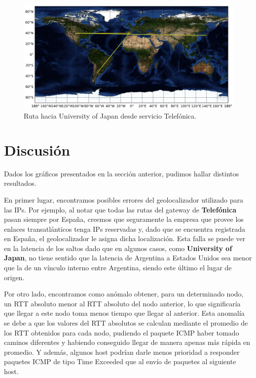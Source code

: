 \documentclass[10pt, a4paper]{article}
\begin{document}
\begin{figure}[H] %
\begin{center}
\includegraphics[width=400pt]{../imgs/map-iuj(telef).png}
\caption{Ruta hacia University of Japan desde servicio Telefónica.}
\end{center}
\end{figure}




\newpage
\section{Discusión}
Dados los gráficos presentados en la sección anterior, pudimos hallar distintos resultados. 

En primer lugar, encontramos posibles errores del geolocalizador utilizado para las IPs. Por ejemplo, al notar que todas las rutas del gateway de \textbf{Telefónica} pasan siempre por España, creemos que seguramente la empresa que provee los enlaces transatlánticos tenga IPs reservadas y, dado que se encuentra registrada en España, el geolocalizador le asigna dicha localización. Esta falla se puede ver en la latencia de los saltos dado que en algunos casos, como \textbf{University of Japan}, no tiene sentido que la latencia de Argentina a Estados Unidos sea menor que la de un vínculo interno entre Argentina, siendo este último el lugar de origen.

Por otro lado, encontramos como anómalo obtener, para un determinado nodo, un RTT absoluto menor al RTT absoluto del nodo anterior, lo que significaría que llegar a este nodo toma menos tiempo que llegar al anterior. Esta anomalía se debe a que los valores del RTT absolutos se calculan mediante el promedio de los RTT obtenidos para cada nodo, pudiendo el paquete ICMP haber tomado caminos diferentes y habiendo conseguido llegar de manera apenas más rápida en promedio. Y además, algunos host podrían darle menos prioridad a responder paquetes ICMP de tipo Time Exceeded que al envío de paquetes al siguiente host.
\end{document}
